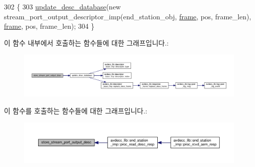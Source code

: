 \begin{DoxyCode}
302 \{
303     \hyperlink{classavdecc__lib_1_1configuration__descriptor__imp_a98445251711b644b6da09d2354003778}{update\_desc\_database}(\textcolor{keyword}{new} stream\_port\_output\_descriptor\_imp(end\_station\_obj, 
      \hyperlink{gst__avb__playbin_8c_ac8e710e0b5e994c0545d75d69868c6f0}{frame}, pos, frame\_len), \hyperlink{gst__avb__playbin_8c_ac8e710e0b5e994c0545d75d69868c6f0}{frame}, pos, frame\_len);
304 \}
\end{DoxyCode}


이 함수 내부에서 호출하는 함수들에 대한 그래프입니다.\+:
\nopagebreak
\begin{figure}[H]
\begin{center}
\leavevmode
\includegraphics[width=350pt]{classavdecc__lib_1_1configuration__descriptor__imp_a6de6493b7555ec22eb920e5a1eff6347_cgraph}
\end{center}
\end{figure}




이 함수를 호출하는 함수들에 대한 그래프입니다.\+:
\nopagebreak
\begin{figure}[H]
\begin{center}
\leavevmode
\includegraphics[width=350pt]{classavdecc__lib_1_1configuration__descriptor__imp_a6de6493b7555ec22eb920e5a1eff6347_icgraph}
\end{center}
\end{figure}


